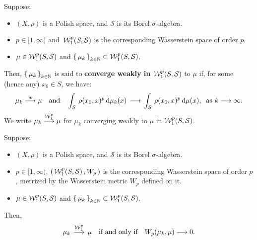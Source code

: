 \begin{definition}
\label{definition:WassersteinConvergence}
\mbox{}\vskip 0.1cm
\noindent
Suppose:
\begin{itemize}
\item $(X, \rho)$ is a Polish space, and $\mathcal{S}$ is its Borel $\sigma$-algebra.
\item $p \in [1,\infty)$ and\,
	$\mathcal{W}^{p}_{1}\!\left(S,\mathcal{S}\right)$ is the corresponding Wasserstein space of order $p$.
\item $\mu \in \mathcal{W}^{p}_{1}\!\left(S,\mathcal{S}\right)$ and
	$\left\{\,\mu_{k}\,\right\}_{k\in\mathbb{N}} \subset \mathcal{W}^{p}_{1}\!\left(S,\mathcal{S}\right)$.
\end{itemize}
Then, $\left\{\,\mu_{k}\,\right\}_{k\in\mathbb{N}}$ is said to
\textbf{converge weakly in $\mathcal{W}^{p}_{1}\!\left(S,\mathcal{S}\right)$} to $\mu$
if, for some (hence any) $x_{0} \in S$, we have:
\begin{equation*}
\mu_{k} \overset{w}{\longrightarrow} \mu
\quad\textnormal{and}\quad
\int_{S}\, \rho(x_{0},x)^{p}\,\textnormal{d}\mu_{k}(x) \,\longrightarrow\,\int_{S}\, \rho(x_{0},x)^{p}\,\textnormal{d}\mu(x),
\;\;\textnormal{as $k \longrightarrow \infty$}.
\end{equation*}
We write $\mu_{k} \overset{\mathcal{W}^{p}_{1}}{\longrightarrow} \mu$
for $\mu_{k}$ converging weakly to $\mu$ in $\mathcal{W}^{p}_{1}\!\left(S,\mathcal{S}\right)$.
\end{definition}

\begin{theorem}
\label{theorem:WassersteinMetricMetrizesWassersteinConvergence}
\noindent
Suppose:
\begin{itemize}
\item $(X, \rho)$ is a Polish space, and $\mathcal{S}$ is its Borel $\sigma$-algebra.
\item $p \in [1,\infty)$,
	$\left(\,\mathcal{W}^{p}_{1}\!\left(S,\mathcal{S}\right),W_{p}\,\right)$ is the corresponding Wasserstein space of order $p$,
	metrized by the Wasserstein metric $W_{p}$ defined on it.
\item $\mu \in \mathcal{W}^{p}_{1}\!\left(S,\mathcal{S}\right)$ and
	$\left\{\,\mu_{k}\,\right\}_{k\in\mathbb{N}} \subset \mathcal{W}^{p}_{1}\!\left(S,\mathcal{S}\right)$.
\end{itemize}
Then,
\begin{equation*}
\mu_{k} \, \overset{\mathcal{W}^{p}_{1}}{\longrightarrow} \, \mu
\quad\textnormal{if and only if}\quad
W_{p}\!\left(\mu_{k},\mu\right) \longrightarrow 0.
\end{equation*}
\end{theorem}

